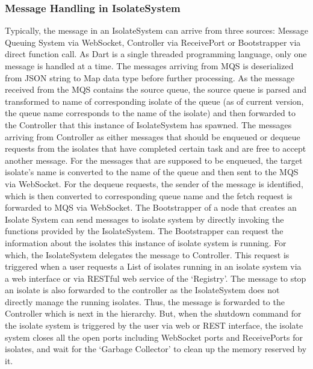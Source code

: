   \subsubsection{Message Handling in IsolateSystem}
  Typically, the message in an IsolateSystem can arrive from three sources: Message Queuing System via WebSocket, Controller via ReceivePort or Bootstrapper via direct function call. As Dart is a single threaded programming language, only one message is handled at a time.
  The messages arriving from MQS is deserialized from JSON string to Map data type before further processing. As the message received from the MQS contains the source queue, the source queue is parsed and transformed to name of corresponding isolate of the queue (as of current version, the queue name corresponds to the name of the isolate) and then forwarded to the Controller that this instance of IsolateSystem has spawned.
  The messages arriving from Controller as either messages that should be enqueued or dequeue requests from the isolates that have completed certain task and are free to accept another message. For the messages that are supposed to be enqueued, the target isolate's name is converted to the name of the queue and then sent to the MQS via WebSocket. For the dequeue requests, the sender of the message is identified, which is then converted to corresponding queue name and the fetch request is forwarded to MQS via WebSocket.
  The Bootstrapper of a node that creates an Isolate System can send messages to isolate system by directly invoking the functions provided by the IsolateSystem.
The Bootstrapper can request the information about the isolates this instance of isolate system is running. For which, the IsolateSystem delegates the message to Controller. This request is triggered when a user requests a List of isolates running in an isolate system via a web interface or via RESTful web service of
the ‘Registry’. The message to stop an isolate is also forwarded to the controller as the IsolateSystem does not directly manage the running isolates. Thus, the message is forwarded to the Controller which is next in the hierarchy.
But, when the shutdown command for the isolate system is triggered by the user via web or REST interface, the isolate system closes all the open ports including WebSocket ports and ReceivePorts for isolates, and wait for the ‘Garbage Collector’ to clean up the memory reserved by it.

